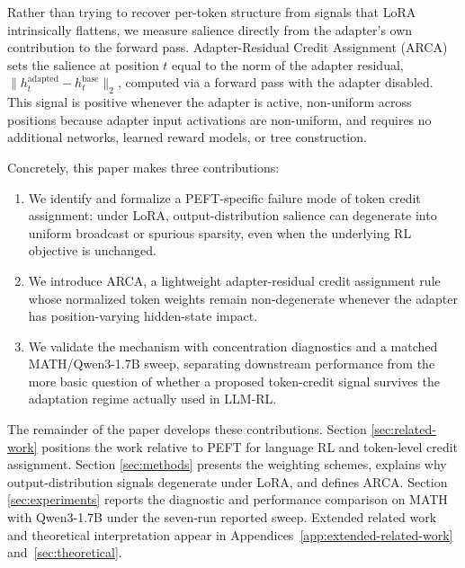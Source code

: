 Rather than trying to recover per-token structure from signals that LoRA
intrinsically flattens, we measure salience directly from the adapter's own
contribution to the forward pass. Adapter-Residual Credit Assignment (ARCA)
sets the salience at position $t$ equal to the norm of the adapter residual,
$\|h^{\text{adapted}}_t - h^{\text{base}}_t\|_2$, computed via a forward pass
with the adapter disabled. This signal is positive whenever the adapter is
active, non-uniform across positions because adapter input activations are
non-uniform, and requires no additional networks, learned reward models, or tree
construction.

Concretely, this paper makes three contributions:
\begin{enumerate}
    \item We identify and formalize a PEFT-specific failure mode of token
    credit assignment: under LoRA, output-distribution salience can degenerate
    into uniform broadcast or spurious sparsity, even when the underlying RL
    objective is unchanged.
    \item We introduce ARCA, a lightweight adapter-residual credit assignment
    rule whose normalized token weights remain non-degenerate whenever the
    adapter has position-varying hidden-state impact.
    \item We validate the mechanism with concentration diagnostics and a
    matched MATH/Qwen3-1.7B sweep, separating downstream performance from the
    more basic question of whether a proposed token-credit signal survives the
    adaptation regime actually used in LLM-RL.
\end{enumerate}

The remainder of the paper develops these contributions. Section
\ref{sec:related-work} positions the work relative to PEFT for language RL
and token-level credit assignment. Section \ref{sec:methods} presents the
weighting schemes, explains why output-distribution signals degenerate under
LoRA, and defines ARCA. Section \ref{sec:experiments} reports the diagnostic
and performance comparison on MATH with Qwen3-1.7B under the seven-run
reported sweep. Extended related work and theoretical interpretation
appear in Appendices~\ref{app:extended-related-work}
and~\ref{sec:theoretical}.
